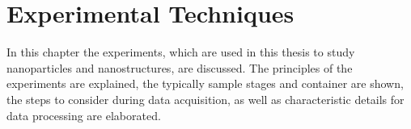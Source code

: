 \documentclass[\main/dresen_thesis.tex]{subfiles}
\renewcommand{\thisPath}{\main/chapters/methods}
\begin{document}
  \chapter{Experimental Techniques}\label{ch:methods}
    In this chapter the experiments, which are used in this thesis to study nanoparticles and nanostructures, are discussed.
    The principles of the experiments are explained, the typically sample stages and container are shown, the steps to consider during data acquisition, as well as characteristic details for data processing are elaborated.

    
      \FloatBarrier
    
      \FloatBarrier
    
      \FloatBarrier
    
      \FloatBarrier
    
      \FloatBarrier
    
      \FloatBarrier
    
      \FloatBarrier
    
      \FloatBarrier
    
      \FloatBarrier
\end{document}
